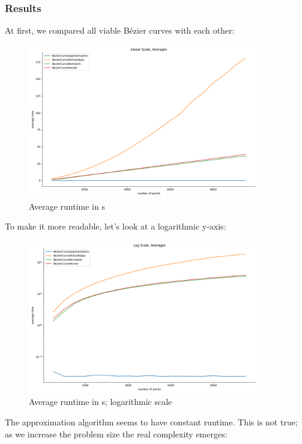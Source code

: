 \subsubsection{Results}
At first, we compared all viable Bézier curves with each other:
\begin{figure}[H]
    \centering
    \includegraphics[width=0.9\textwidth]{bezier_lin.png}
    \caption{Average runtime in s}
    \label{fig:my_label}
\end{figure}
To make it more readable, let's look at a logarithmic y-axis:
\begin{figure}[H]
    \centering
    \includegraphics[width=0.9\textwidth]{bezier_log.png}
    \caption{Average runtime in s; logarithmic scale}
    \label{fig:my_label}
\end{figure}
The approximation algorithm seems to have constant runtime. This is not true; as we increase the problem size the real complexity emerges:
